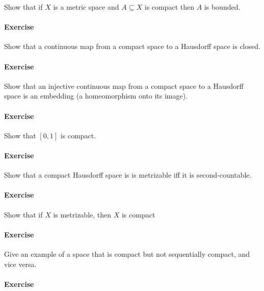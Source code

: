 Show that if \(X\) is a metric space and \(A\subseteq X\) is compact
then \(A\) is bounded.

\hypertarget{exercise-24}{%
\paragraph{Exercise}\label{exercise-24}}

Show that a continuous map from a compact space to a Hausdorff space is
closed.

\hypertarget{exercise-25}{%
\paragraph{Exercise}\label{exercise-25}}

Show that an injective continuous map from a compact space to a
Hausdorff space is an embedding (a homeomorphism onto its image).

\hypertarget{exercise-26}{%
\paragraph{Exercise}\label{exercise-26}}

Show that \([0, 1]\) is compact.

\hypertarget{exercise-27}{%
\paragraph{Exercise}\label{exercise-27}}

Show that a compact Hausdorff space is is metrizable iff it is
second-countable.

\hypertarget{exercise-28}{%
\paragraph{Exercise}\label{exercise-28}}

Show that if \(X\) is metrizable, then \(X\) is compact

\hypertarget{exercise-29}{%
\paragraph{Exercise}\label{exercise-29}}

Give an example of a space that is compact but not sequentially compact,
and vice versa.

\hypertarget{exercise-30}{%
\paragraph{Exercise}\label{exercise-30}}

